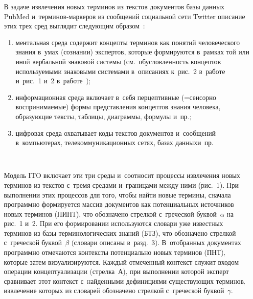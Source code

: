 \begin{multicols}{2}
  В задаче извлечения новых терминов из текстов документов базы данных 
PubMed и~тер\-ми\-нов-мар\-ке\-ров из сообщений социальной сети Twitter 
описание этих трех сред выглядит следующим образом~\cite{8-zac}:
  \begin{enumerate}[(1)]
\item ментальная среда содержит концепты терминов как понятий 
человеческого знания в~умах (сознании) экспертов, которые формируются 
в~рамках той или иной вербальной знаковой сис\-те\-мы (см.\ обуслов\-лен\-ность 
концептов ис\-поль\-зу\-емы\-ми знаковыми сис\-те\-ма\-ми в~описаниях к~рис.~2 
в~работе~\cite{17-zac} и~рис.~1 и~2  
в~работе~\cite{18-zac});
\item информационная среда включает в~себя перцептивные (=\;сенсорно 
воспринимаемые) формы пред\-став\-ле\-ния концептов знания человека, образующие текс\-ты, 
таблицы, диаграммы, формулы и~пр.;
\item цифровая среда охватывает коды текс\-тов документов и~сообщений 
в~компьютерах, телекоммуникационных сетях, базах данных\linebreak и~пр.
  \end{enumerate}
  
  \begin{figure*} %
\vspace*{1pt}
  \begin{center}  
    \mbox{%
\epsfxsize=128mm
}
\end{center}
\vspace*{-12pt}
\vspace*{-3pt}
\end{figure*}

  Модель ITO включает эти три среды и~соотносит процессы извлечения новых 
терминов из текстов с~тремя средами и~границами между ними (рис.~1). При 
выполнении этих процессов для того, чтобы найти новые термины, сначала 
программно формируется массив документов как потенциальных источников 
новых терминов (ПИНТ), что обозначено стрелкой с~греческой буквой~$\alpha$ на 
рис.~1 и~2. При его формировании используются словари уже известных терминов 
из базы терминологических знаний (БТЗ), что обозначено стрелкой с~греческой 
буквой~$\beta$ (словари описаны в~разд.~3). В~отобранных документах 
программно отмечаются контексты потенциально новых терминов (ПНТ), 
которые затем визуализируются. Каждый отмеченный контекст служит входом 
операции концептуализации (стрелка~А), при выполнении которой эксперт 
сравнивает этот контекст с~найденными дефинициями существующих терминов, 
извлечение которых из словарей обозначено стрелкой с~греческой 
бук\-вой~$\gamma$.
  




\end{multicols}
